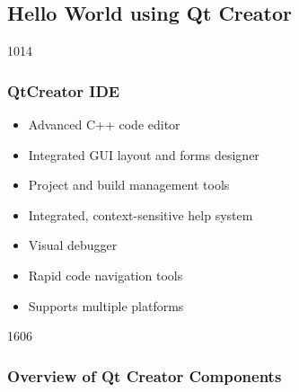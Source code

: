 %
%
%
%

\subsection{Hello World using Qt Creator}

\begin{slide}{1014}\frametitle{QtCreator IDE} \label{qtcreator}
\begin{itemize}
  \item Advanced C++ code editor
  \item Integrated GUI layout and forms designer
  \item Project and build management tools
  \item Integrated, context-sensitive help system
  \item Visual debugger
  \item Rapid code navigation tools
  \item Supports multiple platforms
  \end{itemize}
\end{slide}


\begin{slide}{1606}
  \frametitle{Overview of Qt Creator Components}
\end{slide}

